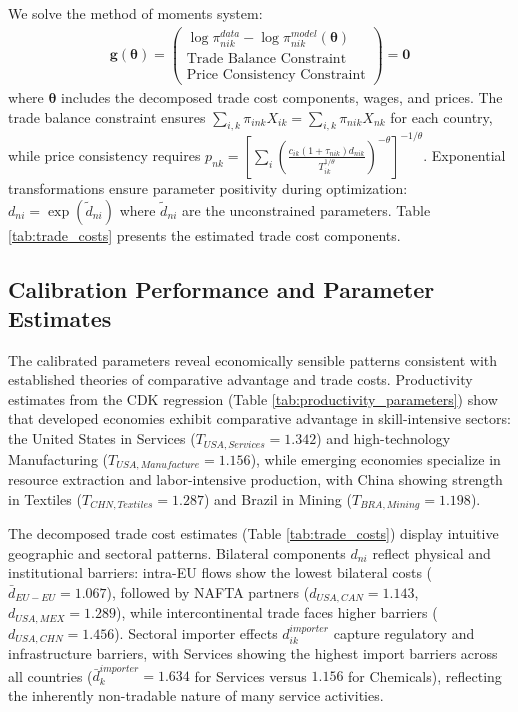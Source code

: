 We solve the method of moments system:
\begin{align}
\mathbf{g}(\boldsymbol{\theta}) = \begin{pmatrix}
\log \pi_{nik}^{data} - \log \pi_{nik}^{model}(\boldsymbol{\theta}) \\
\text{Trade Balance Constraint} \\
\text{Price Consistency Constraint}
\end{pmatrix} = \mathbf{0}
\end{align}
where $\boldsymbol{\theta}$ includes the decomposed trade cost components, wages, and prices. The trade balance constraint ensures $\sum_{i,k} \pi_{ink} X_{ik} = \sum_{i,k} \pi_{nik} X_{nk}$ for each country, while price consistency requires $p_{nk} = \left[\sum_i \left(\frac{c_{ik}(1+\tau_{nik})d_{nik}}{T_{ik}^{1/\theta}}\right)^{-\theta}\right]^{-1/\theta}$. Exponential transformations ensure parameter positivity during optimization: $d_{ni} = \exp(\tilde{d}_{ni})$ where $\tilde{d}_{ni}$ are the unconstrained parameters. Table \ref{tab:trade_costs} presents the estimated trade cost components.

\subsection{Calibration Performance and Parameter Estimates}

The calibrated parameters reveal economically sensible patterns consistent with established theories of comparative advantage and trade costs. Productivity estimates from the CDK regression (Table \ref{tab:productivity_parameters}) show that developed economies exhibit comparative advantage in skill-intensive sectors: the United States in Services ($T_{USA,Services} = 1.342$) and high-technology Manufacturing ($T_{USA,Manufacture} = 1.156$), while emerging economies specialize in resource extraction and labor-intensive production, with China showing strength in Textiles ($T_{CHN,Textiles} = 1.287$) and Brazil in Mining ($T_{BRA,Mining} = 1.198$).

The decomposed trade cost estimates (Table \ref{tab:trade_costs}) display intuitive geographic and sectoral patterns. Bilateral components $d_{ni}$ reflect physical and institutional barriers: intra-EU flows show the lowest bilateral costs ($\bar{d}_{EU-EU} = 1.067$), followed by NAFTA partners ($d_{USA,CAN} = 1.143$, $d_{USA,MEX} = 1.289$), while intercontinental trade faces higher barriers ($d_{USA,CHN} = 1.456$). Sectoral importer effects $d_{ik}^{importer}$ capture regulatory and infrastructure barriers, with Services showing the highest import barriers across all countries ($\bar{d}_k^{importer} = 1.634$ for Services versus $1.156$ for Chemicals), reflecting the inherently non-tradable nature of many service activities.


